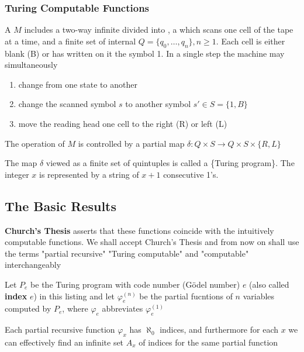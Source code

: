 \documentclass[11pt]{article}
\begin{document}
\subsubsection{Turing Computable Functions}
\label{sec:org4550c29}
A  \(M\) includes a two-way infinite  divided into
, a  which scans one cell of the tape at a time,
and a finite set of internal  \(Q=\{q_0,\dots,q_n\},n\ge 1\). Each
cell is either blank (B) or has written on it the symbol 1. In a single step
the machine may simultaneously
\begin{enumerate}
\item change from one state to another
\item change the scanned symbol \(s\) to another symbol \(s'\in S=\{1,B\}\)
\item move the reading head one cell to the right (R) or left (L)
\end{enumerate}


The operation of \(M\) is controlled by a partial map 
\(\delta:Q\times S\to Q\times S\times\{R,L\}\)

The map \(\delta\) viewed as a finite set of quintuples is called a \tf\{Turing
program\}. The  integer \(x\) is represented by a string of \(x+1\)
consecutive 1's.
\subsection{The Basic Results}
\label{sec:org4da9d58}
\textbf{Church's Thesis} asserts that these functions coincide with the
intuitively computable functions. We shall accept Church's Thesis and from
now on shall use the terms "partial recursive" "Turing computable" and
"computable" interchangeably

\begin{definition}[]
Let \(P_e\) be the Turing program with code number (Gödel number) \(e\) 
(also called \textbf{index} \(e\)) in this
listing and let \(\varphi_e^{(n)}\) be the partial fucntions of \(n\) variables
computed by \(P_e\), where \(\varphi_e\) abbreviates \(\varphi_e^{(1)}\)
\end{definition}

\begin{lemma}
Each partial recursive function \(\varphi_x\) has \(\aleph_0\) indices, and
furthermore for each \(x\) we can effectively find an infinite set \(A_x\) of
indices for the same partial function
\end{lemma}
\end{document}
